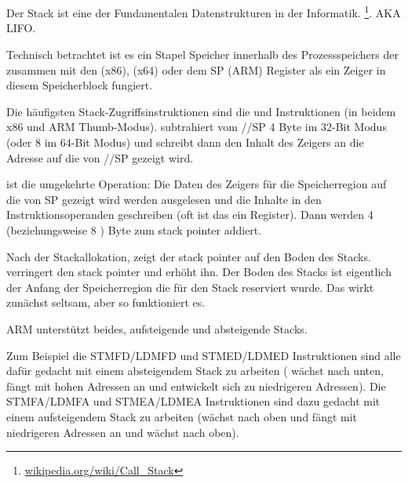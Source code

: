\section{\Stack}
\label{sec:stack}
\myindex{\Stack}

Der Stack ist eine der Fundamentalen Datenstrukturen in der Informatik.
\footnote{\href{http://go.yurichev.com/17119}{wikipedia.org/wiki/Call\_Stack}}.
\ac{AKA} \ac{LIFO}.

Technisch betrachtet ist es ein Stapel Speicher innerhalb des Prozessspeichers der zusammen mit den \ESP (x86), \RSP (x64) oder dem \ac{SP} (ARM) Register als ein Zeiger in diesem Speicherblock fungiert.


Die häufigsten Stack-Zugriffsinstruktionen sind die \PUSH und \POP Instruktionen (in beidem x86 und ARM Thumb-Modus). \PUSH subtrahiert vom \ESP/\RSP/\ac{SP} 4 Byte im 32-Bit Modus (oder 8 im 64-Bit Modus) und schreibt dann den Inhalt des Zeigers an die Adresse auf die von \ESP/\RSP/\ac{SP} gezeigt wird.

\POP ist die umgekehrte Operation: Die Daten des Zeigers für die Speicherregion auf die von \ac{SP}
gezeigt wird werden ausgelesen und die Inhalte in den Instruktionsoperanden geschreiben (oft ist das ein Register). Dann werden 4 (beziehungsweise 8 ) Byte zum \gls{stack pointer} addiert.

Nach der Stackallokation, zeigt der \gls{stack pointer} auf den Boden des Stacks.
\PUSH verringert den \gls{stack pointer} und \POP erhöht ihn.
Der Boden des Stacks ist eigentlich der Anfang der Speicherregion die für den Stack reserviert wurde.
Das wirkt zunächst seltsam, aber so funktioniert es.

ARM unterstützt beides, aufsteigende und absteigende Stacks.


Zum Beispiel die \ac{STMFD}/\ac{LDMFD} und \ac{STMED}/\ac{LDMED} Instruktionen sind alle dafür gedacht mit einem absteigendem Stack zu arbeiten ( wächst nach unten, fängt mit hohen Adressen an und entwickelt sich zu niedrigeren Adressen). Die \ac{STMFA}/\ac{LDMFA} und \ac{STMEA}/\ac{LDMEA} Instruktionen sind dazu gedacht mit einem aufsteigendem Stack zu arbeiten (wächst nach oben und fängt mit niedrigeren Adressen an und wächst nach oben).


